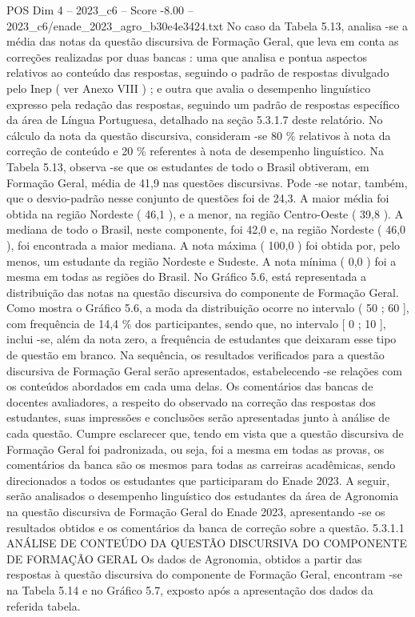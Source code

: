 \begin{textsample}{POS Dim 4 – 2023\_c6 – Score -8.00 – 2023\_c6/enade\_2023\_agro\_b30e4e3424.txt}
No caso da Tabela 5.13, analisa -se a média das notas da questão discursiva de Formação Geral, que leva em conta as correções realizadas por duas bancas : uma que analisa e pontua aspectos relativos ao conteúdo das respostas, seguindo o padrão de respostas divulgado pelo Inep ( ver Anexo VIII ) ; e outra que avalia o desempenho linguístico expresso pela redação das respostas, seguindo um padrão de respostas específico da área de Língua Portuguesa, detalhado na seção 5.3.1.7 deste relatório.
No cálculo da nota da questão discursiva, consideram -se 80 \% relativos à nota da correção de conteúdo e 20 \% referentes à nota de desempenho linguístico.
Na Tabela 5.13, observa -se que os estudantes de todo o Brasil obtiveram, em Formação Geral, média de 41,9 nas questões discursivas.
Pode -se notar, também, que o desvio-padrão nesse conjunto de questões foi de 24,3.
A maior média foi obtida na região Nordeste ( 46,1 ), e a menor, na região Centro-Oeste ( 39,8 ).
A mediana de todo o Brasil, neste componente, foi 42,0 e, na região Nordeste ( 46,0 ), foi encontrada a maior mediana.
A nota máxima ( 100,0 ) foi obtida por, pelo menos, um estudante da região Nordeste e Sudeste.
A nota mínima ( 0,0 ) foi a mesma em todas as regiões do Brasil.
No Gráfico 5.6, está representada a distribuição das notas na questão discursiva do componente de Formação Geral.
Como mostra o Gráfico 5.6, a moda da distribuição ocorre no intervalo ( 50 ; 60 ], com frequência de 14,4 \% dos participantes, sendo que, no intervalo [ 0 ; 10 ], inclui -se, além da nota zero, a frequência de estudantes que deixaram esse tipo de questão em branco.
Na sequência, os resultados verificados para a questão discursiva de Formação Geral serão apresentados, estabelecendo -se relações com os conteúdos abordados em cada uma delas.
Os comentários das bancas de docentes avaliadores, a respeito do observado na correção das respostas dos estudantes, suas impressões e conclusões serão apresentadas junto à análise de cada questão.
Cumpre esclarecer que, tendo em vista que a questão discursiva de Formação Geral foi padronizada, ou seja, foi a mesma em todas as provas, os comentários da banca são os mesmos para todas as carreiras acadêmicas, sendo direcionados a todos os estudantes que participaram do Enade 2023.
A seguir, serão analisados o desempenho linguístico dos estudantes da área de Agronomia na questão discursiva de Formação Geral do Enade 2023, apresentando -se os resultados obtidos e os comentários da banca de correção sobre a questão. 5.3.1.1 ANÁLISE DE CONTEÚDO DA QUESTÃO DISCURSIVA DO COMPONENTE DE FORMAÇÃO GERAL Os dados de Agronomia, obtidos a partir das respostas à questão discursiva do componente de Formação Geral, encontram -se na Tabela 5.14 e no Gráfico 5.7, exposto após a apresentação dos dados da referida tabela.

\end{textsample}
